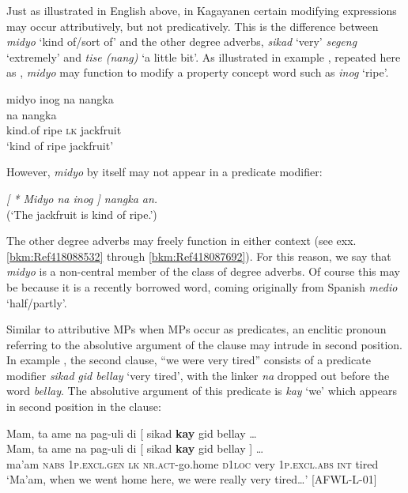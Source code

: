 Just as illustrated in English above, in Kagayanen certain modifying expressions may occur attributively, but not predicatively. This is the difference between \textit{midyo} ‘kind of/sort of’ and the other degree adverbs, \textit{sikad} ‘very’ \textit{segeng} ‘extremely’ and \textit{tise (nang)} ‘a little bit’. As illustrated in example , repeated here as , \textit{midyo} may function to modify a property concept word such as \textit{inog} ‘ripe’.

\ea
\label{bkm:Ref418089153}
midyo  inog  na  nangka \\\smallskip
   na  nangka \\
 {} kind.of  ripe {} \textsc{lk}  jackfruit \\
\glt  ‘kind of ripe jackfruit’
\z

However, \textit{midyo} by itself may not appear in a predicate modifier:

\ea
\textit{[ * Midyo na inog ] nangka an.} \\
(‘The jackfruit is kind of ripe.’)
\z

The other degree adverbs may freely function in either context (see exx. \ref{bkm:Ref418088532} through \ref{bkm:Ref418087692}). For this reason, we say that \textit{midyo} is a non-central member of the class of degree adverbs. Of course this may be because it is a recently borrowed word, coming originally from Spanish \textit{medio} ‘half/partly’.

Similar to attributive MPs when MPs occur as predicates, an enclitic pronoun referring to the absolutive argument of the clause may intrude in second position. In example , the second clause, “we were very tired” consists of a predicate modifier \textit{sikad}\textbf{ }\textit{gid bellay} ‘very tired’, with the linker \textit{na} dropped out before the word \textit{bellay}. The absolutive argument of this predicate is \textit{kay} ‘we’ which appears in second position in the clause:

\ea
\label{bkm:Ref418091763}
Mam,  ta  ame  na  pag-uli  di {}[ sikad  \textbf{kay}  gid  bellay … \\\smallskip
 \gll Mam,  ta  ame  na  pag-uli  di {}[ sikad  \textbf{kay}  gid  bellay ] … \\
ma’am  \textsc{nabs}  1\textsc{p.excl.gen}  \textsc{lk}  \textsc{nr.act}-go.home  \textsc{d}1\textsc{loc} {} very  1\textsc{p.excl.abs}  \textsc{int}  tired {} \\
\glt `Ma’am, when we went home here, we were really very tired…' [AFWL-L-01]
\z

